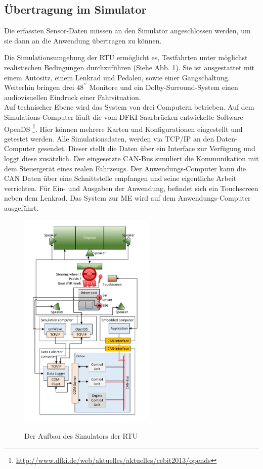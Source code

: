 {\subsection{Übertragung im Simulator}
\label{subsec:sim}
Die erfassten Sensor-Daten müssen an den Simulator angeschlossen werden, um sie dann an die Anwendung übertragen zu können.

Die Simulationsumgebung der \acl{RTU} ermöglicht es, Testfahrten unter möglichst realistischen Bedingungen durchzuführen (Siehe Abb. \ref{fig:architecure}). Sie ist ausgestattet mit einem Autositz, einem Lenkrad und Pedalen, sowie einer Gangschaltung. Weiterhin bringen drei $48^{\prime\prime}$ Monitore und ein Dolby-Surround-System einen audiovisuellen Eindruck einer Fahrsituation.\\

Auf technischer Ebene wird das System von drei Computern betrieben. Auf dem Simulations-Computer läuft die vom DFKI Saarbrücken entwickelte Software OpenDS \footnote{\url{http://www.dfki.de/web/aktuelles/aktuelles/cebit2013/opends}}. Hier können mehrere Karten und Konfigurationen eingestellt und getestet werden. 
Alle Simulationsdaten, werden via TCP/IP an den Daten-Computer  gesendet. Dieser stellt die Daten über ein Interface zur Verfügung und loggt diese zusätzlich. Der eingesetzte CAN-Bus simuliert die Kommunikation mit dem Steuergerät eines realen Fahrzeugs. 
Der Anwendungs-Computer kann die CAN Daten über eine Schnittstelle empfangen und seine eigentliche Arbeit verrichten. Für Ein- und Ausgaben der Anwendung, befindet sich ein Touchscreen neben dem Lenkrad. Das System zur \acl{ME} wird auf dem Anwendungs-Computer ausgeführt.
\begin{figure}[h] 
  \begin{center}
    \includegraphics[width=6.5cm]{img/architecture}
    \label{fig:architecure}
    \caption[Aufbau des Simulators]{Der Aufbau des Simulators der \acl{RTU}}
  \end{center}
\end{figure}

}
